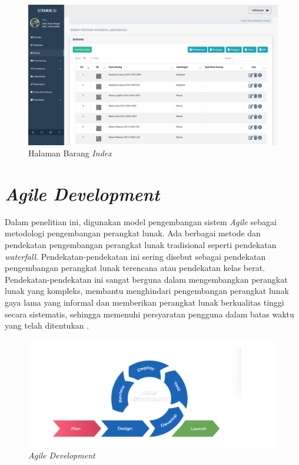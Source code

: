 \begin{enumerate}
	      \begin{figure}
		      \centering
		      \includegraphics[width=0.82\linewidth]{konten//gambar/barang.png}
		      \caption{Halaman Barang \textit{Index}}
		      \label{fig:enter-label}
	      \end{figure}

\end{enumerate}

\section{\textit{Agile Development}}
Dalam penelitian ini, digunakan model pengembangan sistem \textit{Agile} sebagai metodologi pengembangan perangkat lunak. Ada berbagai metode dan pendekatan pengembangan perangkat lunak tradisional seperti pendekatan \textit{waterfall}. Pendekatan-pendekatan ini sering disebut sebagai pendekatan pengembangan perangkat lunak terencana atau pendekatan kelas berat. Pendekatan-pendekatan ini sangat berguna dalam mengembangkan perangkat lunak yang kompleks, membantu menghindari pengembangan perangkat lunak gaya lama yang informal dan memberikan perangkat lunak berkualitas tinggi secara sistematis, sehingga memenuhi persyaratan pengguna dalam batas waktu yang telah ditentukan \cite{al2020agile}.

\begin{figure}
	\centering
	\includegraphics[width=0.82\linewidth]{konten//gambar/agile.png}
	\caption{\textit{Agile Development}}
	\label{fig:enter-label}
\end{figure}

